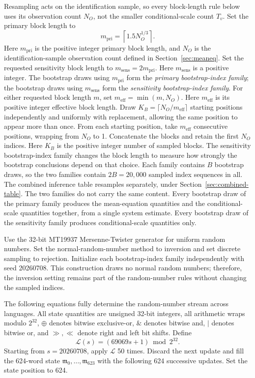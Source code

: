 \documentclass[11pt]{article}
\begin{document}
Resampling acts on the identification sample, so every block-length rule below uses its observation
count \(N_O\), not the smaller conditional-scale count \(T_v\). Set the primary block length to
\begin{equation*}
 m_{\mathrm{pri}}=\left\lceil1.5N_O^{1/3}\right\rceil.
\end{equation*}
Here \(m_{\mathrm{pri}}\) is the positive integer primary block length, and \(N_O\) is the
identification-sample observation count defined in Section~\ref{sec:meaneq}. Set the requested
sensitivity block length to
\(m_{\mathrm{sens}}=2m_{\mathrm{pri}}\). Here \(m_{\mathrm{sens}}\) is a positive integer. The bootstrap draws
using \(m_{\mathrm{pri}}\) form the \emph{primary bootstrap-index family}; the bootstrap draws using
\(m_{\mathrm{sens}}\) form the \emph{sensitivity bootstrap-index family}. For either requested
block length \(m\), set \(m_{\mathrm{eff}}=\min(m,N_O)\). Here \(m_{\mathrm{eff}}\) is its positive
integer effective block length. Draw \(K_B=\lceil N_O/m_{\mathrm{eff}}\rceil\) starting positions independently
and uniformly with replacement, allowing the same position to appear more than once. From each starting position,
take \(m_{\mathrm{eff}}\) consecutive positions, wrapping from \(N_O\) to 1. Concatenate the blocks and retain the
first \(N_O\) indices.
Here \(K_B\) is the positive integer number of sampled blocks.
The sensitivity bootstrap-index family changes the block length to measure how strongly the
bootstrap conclusions depend on that choice. Each family contains \(B\) bootstrap draws, so the two
families contain \(2B=20{,}000\) sampled index sequences in all. The combined inference table
resamples separately, under Section~\ref{sec:combined-table}. The two families do not carry the same
content. Every bootstrap draw of the primary family produces the mean-equation quantities and the
conditional-scale quantities together, from a single system estimate. Every bootstrap draw of the
sensitivity family produces conditional-scale quantities only.

Use the 32-bit MT19937 Mersenne-Twister generator for uniform random numbers. Set the
normal-random-number method to inversion and set discrete sampling to rejection. Initialize each
bootstrap-index family independently with seed 20260708. This construction draws no normal
random numbers; therefore, the inversion setting remains part of the random-number rules without changing
the sampled indices.

The following equations fully determine the random-number stream across languages. All state quantities are
unsigned 32-bit integers, all arithmetic wraps modulo \(2^{32}\), \(\oplus\) denotes bitwise
exclusive-or, \(\mathbin{\&}\) denotes bitwise and, \(\mathbin{|}\) denotes bitwise or, and
\(\gg,\ll\) denote right and left bit shifts. Define
\begin{equation*}
 \mathcal L(s)=(69069s+1)\bmod 2^{32}.
\end{equation*}
Starting from \(s=20260708\), apply \(\mathcal L\) 50 times. Discard the next update and fill the
624-word state \(\mathfrak m_0,\ldots,\mathfrak m_{623}\) with the following 624 successive updates.
Set the state position to 624.
\end{document}
